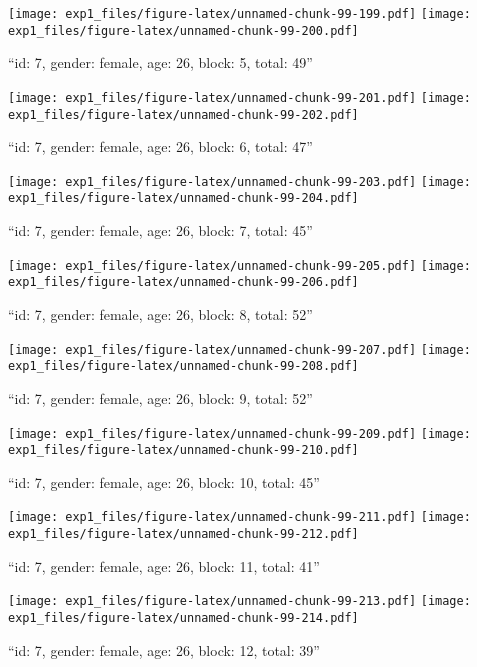 \documentclass[,]{article}
\begin{document}
\texttt{[image: exp1\_files/figure-latex/unnamed-chunk-99-199.pdf]}
\texttt{[image: exp1\_files/figure-latex/unnamed-chunk-99-200.pdf]}

\newpage
[1] 

``id: 7, gender: female, age: 26, block: 5, total: 49''

\texttt{[image: exp1\_files/figure-latex/unnamed-chunk-99-201.pdf]}
\texttt{[image: exp1\_files/figure-latex/unnamed-chunk-99-202.pdf]}

\newpage
[1] 

``id: 7, gender: female, age: 26, block: 6, total: 47''

\texttt{[image: exp1\_files/figure-latex/unnamed-chunk-99-203.pdf]}
\texttt{[image: exp1\_files/figure-latex/unnamed-chunk-99-204.pdf]}

\newpage
[1] 

``id: 7, gender: female, age: 26, block: 7, total: 45''

\texttt{[image: exp1\_files/figure-latex/unnamed-chunk-99-205.pdf]}
\texttt{[image: exp1\_files/figure-latex/unnamed-chunk-99-206.pdf]}

\newpage
[1] 

``id: 7, gender: female, age: 26, block: 8, total: 52''

\texttt{[image: exp1\_files/figure-latex/unnamed-chunk-99-207.pdf]}
\texttt{[image: exp1\_files/figure-latex/unnamed-chunk-99-208.pdf]}

\newpage
[1] 

``id: 7, gender: female, age: 26, block: 9, total: 52''

\texttt{[image: exp1\_files/figure-latex/unnamed-chunk-99-209.pdf]}
\texttt{[image: exp1\_files/figure-latex/unnamed-chunk-99-210.pdf]}

\newpage
[1] 

``id: 7, gender: female, age: 26, block: 10, total: 45''

\texttt{[image: exp1\_files/figure-latex/unnamed-chunk-99-211.pdf]}
\texttt{[image: exp1\_files/figure-latex/unnamed-chunk-99-212.pdf]}

\newpage
[1] 

``id: 7, gender: female, age: 26, block: 11, total: 41''

\texttt{[image: exp1\_files/figure-latex/unnamed-chunk-99-213.pdf]}
\texttt{[image: exp1\_files/figure-latex/unnamed-chunk-99-214.pdf]}

\newpage
[1] 

``id: 7, gender: female, age: 26, block: 12, total: 39''
\end{document}
